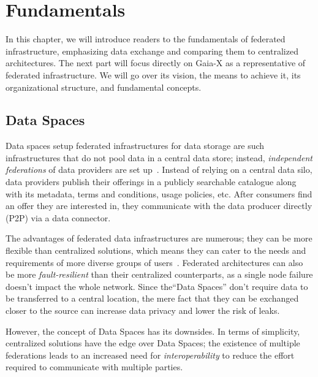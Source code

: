 \chapter{Fundamentals}\label{ch:fundamentals}

\begin{chapterabstract}
    In this chapter, we will introduce readers to the fundamentals of federated infrastructure, emphasizing data exchange and comparing them to centralized architectures.
    The next part will focus directly on Gaia-X as a representative of federated infrastructure.
    We will go over its vision, the means to achieve it, its organizational structure, and fundamental concepts.
\end{chapterabstract}

\section{Data Spaces}\label{sec:federated-data-infrastructures}

Data spaces setup federated infrastructures for data storage are such infrastructures that do not pool data in a central data store; instead, \textit{independent federations} of data providers are set up~\cite{otto_federated_2022}.
Instead of relying on a central data silo, data providers publish their offerings in a publicly searchable catalogue along with its metadata, terms and conditions, usage policies, etc.
After consumers find an offer they are interested in, they communicate with the data producer directly (P2P) via a data connector.

The advantages of federated data infrastructures are numerous; they can be more flexible than centralized solutions, which means they can cater to the needs and requirements of more diverse groups of users~\cite{raab_federated_2023}.
Federated architectures can also be more \textit{fault-resilient} than their centralized counterparts, as a single node failure doesn't impact the whole network.
Since the``Data Spaces'' don't require data to be transferred to a central location, the mere fact that they can be exchanged closer to the source can increase data privacy and lower the risk of leaks.

However, the concept of Data Spaces has its downsides.
In terms of simplicity, centralized solutions have the edge over Data Spaces; the existence of multiple federations leads to an increased need for \textit{interoperability} to reduce the effort required to communicate with multiple parties.

